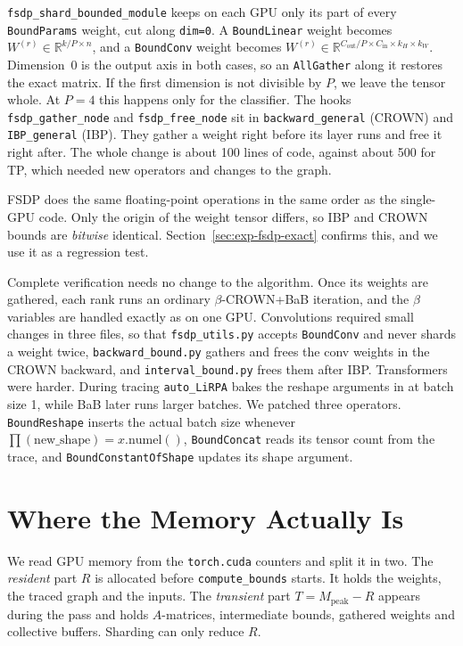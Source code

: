 \documentclass[runningheads]{llncs}
\begin{document}
\texttt{fsdp\_shard\_bounded\_module} keeps on each GPU only its part of every
\texttt{BoundParams} weight, cut along \texttt{dim=0}. A \texttt{BoundLinear}
weight becomes $W^{(r)} \in \mathbb{R}^{k/P \times n}$, and a \texttt{BoundConv}
weight becomes
$W^{(r)} \in \mathbb{R}^{C_\text{out}/P \times C_\text{in} \times k_H \times k_W}$.
Dimension~0 is the output axis in both cases, so an \texttt{AllGather} along it
restores the exact matrix. If the first dimension is not divisible by $P$, we
leave the tensor whole. At $P{=}4$ this happens only for the classifier. The
hooks \texttt{fsdp\_gather\_node} and \texttt{fsdp\_free\_node} sit in
\texttt{backward\_general} (CROWN) and \texttt{IBP\_general} (IBP). They gather a
weight right before its layer runs and free it right after. The whole change is
about 100 lines of code, against about 500 for TP, which needed new operators
and changes to the graph.

FSDP does the same floating-point operations in the same order as the
single-GPU code. Only the origin of the weight tensor differs, so IBP and CROWN
bounds are \emph{bitwise} identical. Section~\ref{sec:exp-fsdp-exact} confirms
this, and we use it as a regression test.

Complete verification needs no change to the algorithm. Once its weights are
gathered, each rank runs an ordinary $\beta$-CROWN{+}BaB iteration, and the
$\beta$ variables are handled exactly as on one GPU. Convolutions required small
changes in three files, so that \texttt{fsdp\_utils.py} accepts
\texttt{BoundConv} and never shards a weight twice,
\texttt{backward\_bound.py} gathers and frees the conv weights in the CROWN
backward, and \texttt{interval\_bound.py} frees them after IBP. Transformers
were harder. During tracing \texttt{auto\_LiRPA} bakes the reshape arguments in
at batch size 1, while BaB later runs larger batches. We patched three
operators. \texttt{BoundReshape} inserts the actual batch size whenever
$\prod(\text{new\_shape}) = x.\text{numel}()$, \texttt{BoundConcat} reads its
tensor count from the trace, and \texttt{BoundConstantOfShape} updates its
shape argument.

\section{Where the Memory Actually Is}
\label{sec:memory}

We read GPU memory from the \texttt{torch.cuda} counters and split it in two.
The \emph{resident} part $R$ is allocated before \texttt{compute\_bounds}
starts. It holds the weights, the traced graph and the inputs. The
\emph{transient} part $T = M_\text{peak} - R$ appears during the pass and holds
$A$-matrices, intermediate bounds, gathered weights and collective buffers.
Sharding can only reduce $R$.
\end{document}
